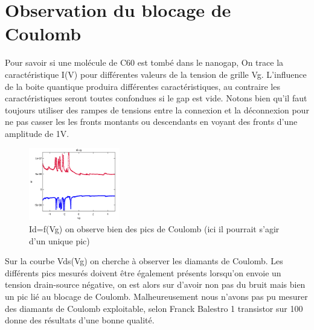 \section{Observation du blocage de Coulomb}
Pour savoir si une molécule de C60 est tombé dans le nanogap, On trace la caractéristique I(V) pour différentes valeurs de la tension de grille Vg. L’influence de la boite quantique produira différentes caractéristiques, au contraire les caractéristiques seront toutes confondues si le gap est vide.
 Notons bien qu’il faut toujours utiliser des rampes de tensions entre la connexion et la déconnexion pour ne pas casser les les fronts montants ou descendants en voyant des fronts d’une amplitude de 1V.
 \begin{figure}[h]
    \begin{center}
        \includegraphics[width=150px]{Images/Image_Blocage_Coulomb_1.png}
        \caption{Id=f(Vg) on observe bien des pics de Coulomb (ici il pourrait s’agir d’un unique pic)}
        \label{fig:}
    \end{center}
\end{figure}
Sur la courbe Vds(Vg) on cherche à observer les diamants de Coulomb. Les différents pics mesurés doivent être également présents lorsqu’on envoie un tension drain-source négative, on est alors sur d’avoir non pas du bruit mais bien un pic lié au blocage de Coulomb.
Malheureusement nous n’avons pas pu mesurer des diamants de Coulomb exploitable, selon Franck Balestro 1 transistor sur 100 donne des résultats d’une bonne qualité.

